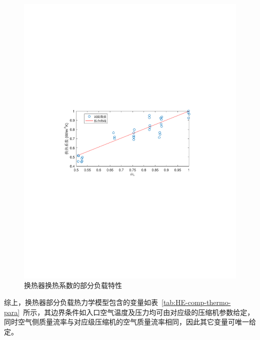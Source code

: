 \begin{figure}[H] %
  \centering
  \includegraphics[scale=0.75]{figures/Chap1-7-HE-Part-Load.pdf}
  \caption{换热器换热系数的部分负载特性}
  \label{fig:HE-Part-Load}
\end{figure}

综上，换热器部分负载热力学模型包含的变量如表~\ref{tab:HE-comp-thermo-para}~所示，其边界条件如入口空气温度及压力均可由对应级的压缩机参数给定，同时空气侧质量流率与对应级压缩机的空气质量流率相同，因此其它变量可唯一给定。

